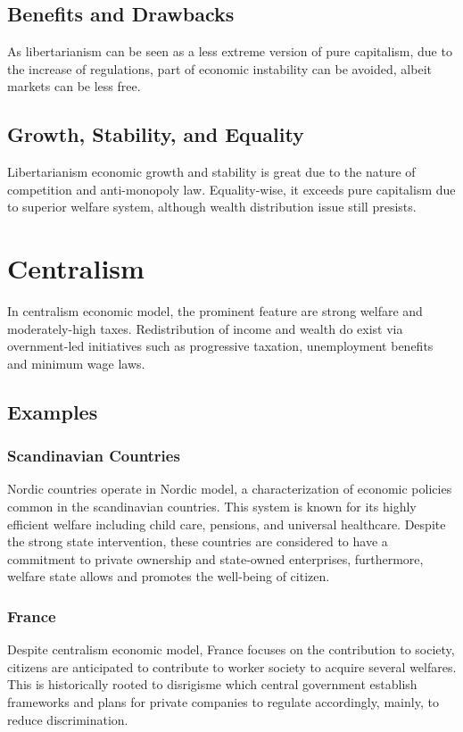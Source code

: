 \documentclass[12pt,twocolumn,a4paper]{article}
\begin{document}
\subsection{Benefits and Drawbacks}
As libertarianism can be seen as a less extreme version of pure capitalism, due to the increase of regulations, part of economic instability can be avoided, albeit markets can be less free.
\subsection{Growth, Stability, and Equality}
Libertarianism economic growth and stability is great due to the nature of competition and anti-monopoly law. Equality-wise, it exceeds pure capitalism due to superior welfare system, although wealth distribution issue still presists.

\section{Centralism}
In centralism economic model, the prominent feature are strong welfare and moderately-high taxes. Redistribution of income and wealth do exist via overnment-led initiatives such as progressive taxation, unemployment benefits and minimum wage laws.
\subsection{Examples}
\subsubsection{Scandinavian Countries}
Nordic countries operate in Nordic model, a characterization of economic policies common in the scandinavian countries. This system is known for its highly efficient welfare including child care, pensions, and universal healthcare. Despite the strong state intervention, these countries are considered to have a commitment to private ownership and state-owned enterprises, furthermore, welfare state allows and promotes the well-being of citizen.
\subsubsection{France}
Despite centralism economic model, France focuses on the contribution to society, citizens are anticipated to contribute to worker society to acquire several welfares. This is historically rooted to disrigisme which central government establish frameworks and plans for private companies to regulate accordingly, mainly, to reduce discrimination.
\end{document}
